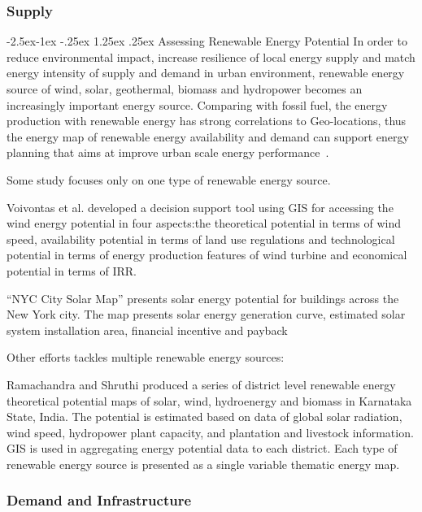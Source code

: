 \documentclass[hidelinks,12pt]{article}
\makeatletter
\renewcommand\paragraph{\@startsection{paragraph}{4}{\z@}%
            {-2.5ex\@plus -1ex \@minus -.25ex}%
            {1.25ex \@plus .25ex}%
            {\normalfont\normalsize\bfseries}}
\makeatother
\begin{document}
\subsubsection{Supply}
\paragraph{Assessing Renewable Energy Potential}
In order to reduce environmental impact, increase resilience of local
energy supply and match energy intensity of supply and demand in urban
environment, renewable energy source of wind, solar, geothermal,
biomass and hydropower becomes an increasingly important energy
source. Comparing with fossil fuel, the energy production with
renewable energy has strong correlations to Geo-locations, thus the
energy map of renewable energy availability and demand can support
energy planning that aims at improve urban scale energy
performance~\cite{Ramachandra20071460}.

Some study focuses only on one type of renewable energy source.

Voivontas et al. developed a decision support tool using GIS for
accessing the wind energy potential in four aspects:the theoretical
potential in terms of wind speed, availability potential in terms of
land use regulations and technological potential in terms of energy
production features of wind turbine and economical potential in terms
of IRR. 

``NYC City Solar Map'' presents solar energy potential for
buildings across the New York city. The map presents solar energy
generation curve, estimated solar system installation area, financial
incentive and payback~\cite{NYCSolarMap}

Other efforts tackles multiple renewable energy sources:

Ramachandra and Shruthi produced a series of district level renewable
energy theoretical potential maps of solar, wind, hydroenergy and
biomass in Karnataka State, India. The potential is estimated based on
data of global solar radiation, wind speed, hydropower plant capacity,
and plantation and livestock information. GIS is used in aggregating
energy potential data to each district. Each type of renewable energy
source is presented as a single variable thematic energy map.

\subsubsection{Demand and Infrastructure}
\end{document}
